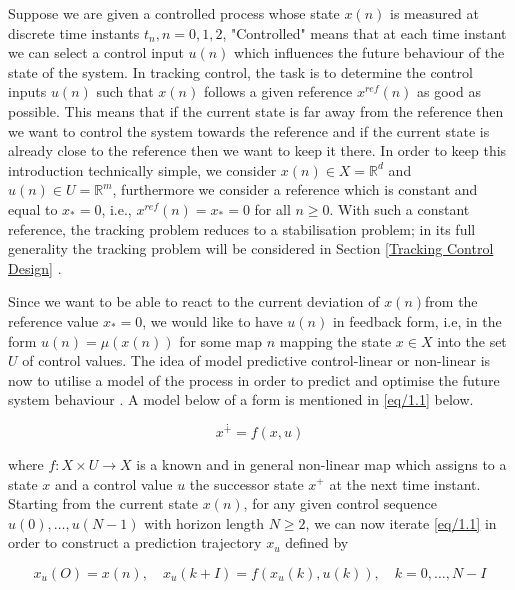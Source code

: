 \documentclass{UoNMCHA}
\numberwithin{equation}{section}
\begin{document}
	Suppose we are given a controlled process whose state $x(n)$ is measured at discrete time instants $t_n,n=0,1,2$, "Controlled" means that at each time instant we can select a control input $u(n)$ which 
	influences the future behaviour of the state of the system. In tracking control, the task is to determine the control inputs $u(n)$ such that $x(n)$ follows a given reference $x^{ref} (n)$ as good as possible. This means that if the current state is far away from the reference then we want to control the system towards the reference and if the current state is already close to the reference then we want to keep it there. In order to keep this introduction technically simple, we consider $x(n)\in X=\mathbb{R}^d$ and $u(n)\in U=\mathbb{R}^m$, furthermore we consider a reference which is constant and equal to $x_{*}=0$, i.e., $x^{ref} (n)=x_{*}=0 $ for all $n\geq 0$. With such a constant reference, the tracking problem reduces to a stabilisation problem; in its full generality the tracking problem will be considered in Section \ref{Tracking Control Design} \cite{larsgrune_2017_nonlinear}.
	
	Since we want to be able to react to the current deviation of $x(n)$from the reference value $x_{*}=0$, we would like to have $u(n)$ in feedback form, i.e, in the form $u(n)=\mu(x(n))$ for some map $n$ mapping the state $x \in X$ into the set $U$ of control values. The idea of model predictive control-linear or non-linear is now to utilise a model of the process in order to predict and optimise the future system behaviour \cite{larsgrune_2017_nonlinear}. A model below of a  form is mentioned in \eqref{eq/1.1} below.
	
	\begin{equation} \label{eq/1.1}
	x^{\dotplus}=f(x,u)
	\end{equation}
	
	where $f: X \times U \rightarrow X$ is a known and in general non-linear map which assigns to a state $x$ and a control
	value $u$ the successor state $x^{+}$ at the next time instant. Starting
	from the current state $x(n)$, for any given control sequence $u(0), \ldots, u(N-1)$ with horizon length	$N \geq 2$, we can now iterate \eqref{eq/1.1} in order to construct a prediction trajectory $x_{u}$ defined by
	
	\begin{equation}\label{eq/1.2}
		x_{u}(O)=x(n), \quad x_{u}(k+I)=f\left(x_{u}(k), u(k)\right), \quad k=0, \ldots, N-I
	\end{equation}
	
\end{document}
